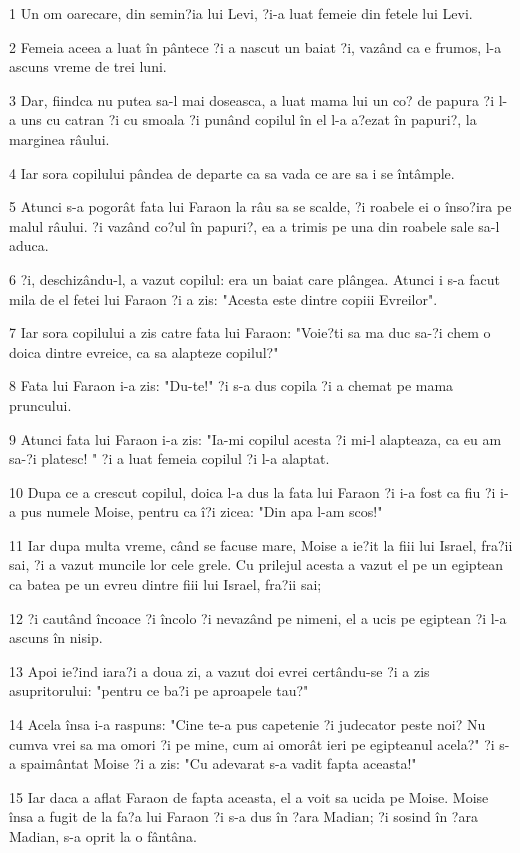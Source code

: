 \par 1 Un om oarecare, din semin?ia lui Levi, ?i-a luat femeie din fetele lui Levi.
\par 2 Femeia aceea a luat în pântece ?i a nascut un baiat ?i, vazând ca e frumos, l-a ascuns vreme de trei luni.
\par 3 Dar, fiindca nu putea sa-l mai doseasca, a luat mama lui un co? de papura ?i l-a uns cu catran ?i cu smoala ?i punând copilul în el l-a a?ezat în papuri?, la marginea râului.
\par 4 Iar sora copilului pândea de departe ca sa vada ce are sa i se întâmple.
\par 5 Atunci s-a pogorât fata lui Faraon la râu sa se scalde, ?i roabele ei o înso?ira pe malul râului. ?i vazând co?ul în papuri?, ea a trimis pe una din roabele sale sa-l aduca.
\par 6 ?i, deschizându-l, a vazut copilul: era un baiat care plângea. Atunci i s-a facut mila de el fetei lui Faraon ?i a zis: "Acesta este dintre copiii Evreilor".
\par 7 Iar sora copilului a zis catre fata lui Faraon: "Voie?ti sa ma duc sa-?i chem o doica dintre evreice, ca sa alapteze copilul?"
\par 8 Fata lui Faraon i-a zis: "Du-te!" ?i s-a dus copila ?i a chemat pe mama pruncului.
\par 9 Atunci fata lui Faraon i-a zis: "Ia-mi copilul acesta ?i mi-l alapteaza, ca eu am sa-?i platesc! " ?i a luat femeia copilul ?i l-a alaptat.
\par 10 Dupa ce a crescut copilul, doica l-a dus la fata lui Faraon ?i i-a fost ca fiu ?i i-a pus numele Moise, pentru ca î?i zicea: "Din apa l-am scos!"
\par 11 Iar dupa multa vreme, când se facuse mare, Moise a ie?it la fiii lui Israel, fra?ii sai, ?i a vazut muncile lor cele grele. Cu prilejul acesta a vazut el pe un egiptean ca batea pe un evreu dintre fiii lui Israel, fra?ii sai;
\par 12 ?i cautând încoace ?i încolo ?i nevazând pe nimeni, el a ucis pe egiptean ?i l-a ascuns în nisip.
\par 13 Apoi ie?ind iara?i a doua zi, a vazut doi evrei certându-se ?i a zis asupritorului: "pentru ce ba?i pe aproapele tau?"
\par 14 Acela însa i-a raspuns: "Cine te-a pus capetenie ?i judecator peste noi? Nu cumva vrei sa ma omori ?i pe mine, cum ai omorât ieri pe egipteanul acela?" ?i s-a spaimântat Moise ?i a zis: "Cu adevarat s-a vadit fapta aceasta!"
\par 15 Iar daca a aflat Faraon de fapta aceasta, el a voit sa ucida pe Moise. Moise însa a fugit de la fa?a lui Faraon ?i s-a dus în ?ara Madian; ?i sosind în ?ara Madian, s-a oprit la o fântâna.
